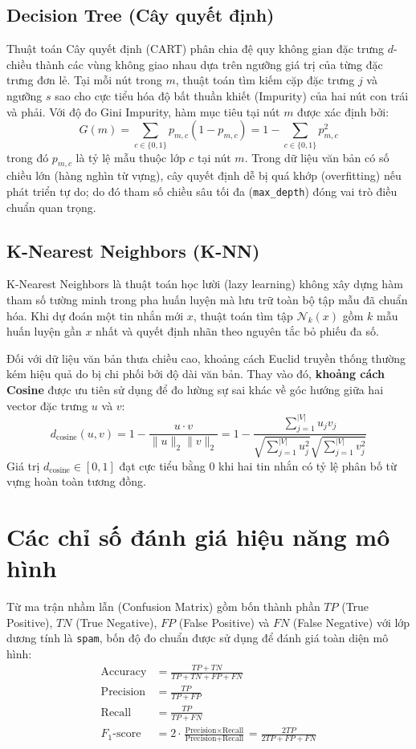 \documentclass[12pt,a4paper]{report}
\begin{document}
\subsection{Decision Tree (Cây quyết định)}
Thuật toán Cây quyết định (CART) phân chia đệ quy không gian đặc trưng $d$-chiều thành các vùng không giao nhau dựa trên ngưỡng giá trị của từng đặc trưng đơn lẻ. Tại mỗi nút trong $m$, thuật toán tìm kiếm cặp đặc trưng $j$ và ngưỡng $s$ sao cho cực tiểu hóa độ bất thuần khiết (Impurity) của hai nút con trái và phải. Với độ đo Gini Impurity, hàm mục tiêu tại nút $m$ được xác định bởi:
\begin{equation}
    G(m) = \sum_{c \in \{0, 1\}} p_{m, c}(1 - p_{m, c}) = 1 - \sum_{c \in \{0, 1\}} p_{m, c}^2
\end{equation}
trong đó $p_{m, c}$ là tỷ lệ mẫu thuộc lớp $c$ tại nút $m$. Trong dữ liệu văn bản có số chiều lớn (hàng nghìn từ vựng), cây quyết định dễ bị quá khớp (overfitting) nếu phát triển tự do; do đó tham số chiều sâu tối đa (\texttt{max\_depth}) đóng vai trò điều chuẩn quan trọng.

\subsection{K-Nearest Neighbors (K-NN)}
K-Nearest Neighbors là thuật toán học lười (lazy learning) không xây dựng hàm tham số tường minh trong pha huấn luyện mà lưu trữ toàn bộ tập mẫu đã chuẩn hóa. Khi dự đoán một tin nhắn mới $x$, thuật toán tìm tập $\mathcal{N}_k(x)$ gồm $k$ mẫu huấn luyện gần $x$ nhất và quyết định nhãn theo nguyên tắc bỏ phiếu đa số.

Đối với dữ liệu văn bản thưa chiều cao, khoảng cách Euclid truyền thống thường kém hiệu quả do bị chi phối bởi độ dài văn bản. Thay vào đó, \textbf{khoảng cách Cosine} được ưu tiên sử dụng để đo lường sự sai khác về góc hướng giữa hai vector đặc trưng $u$ và $v$:
\begin{equation}
    d_{\text{cosine}}(u, v) = 1 - \frac{u \cdot v}{\|u\|_2 \|v\|_2} = 1 - \frac{\sum_{j=1}^{|V|} u_j v_j}{\sqrt{\sum_{j=1}^{|V|} u_j^2}\sqrt{\sum_{j=1}^{|V|} v_j^2}}
\end{equation}
Giá trị $d_{\text{cosine}} \in [0, 1]$ đạt cực tiểu bằng $0$ khi hai tin nhắn có tỷ lệ phân bố từ vựng hoàn toàn tương đồng.

\section{Các chỉ số đánh giá hiệu năng mô hình}
Từ ma trận nhầm lẫn (Confusion Matrix) gồm bốn thành phần $TP$ (True Positive), $TN$ (True Negative), $FP$ (False Positive) và $FN$ (False Negative) với lớp dương tính là \texttt{spam}, bốn độ đo chuẩn được sử dụng để đánh giá toàn diện mô hình:
\begin{align}
    \text{Accuracy} &= \frac{TP + TN}{TP + TN + FP + FN} \\
    \text{Precision} &= \frac{TP}{TP + FP} \\
    \text{Recall} &= \frac{TP}{TP + FN} \\
    F_1\text{-score} &= 2 \cdot \frac{\text{Precision} \times \text{Recall}}{\text{Precision} + \text{Recall}} = \frac{2TP}{2TP + FP + FN}
\end{align}
\end{document}

